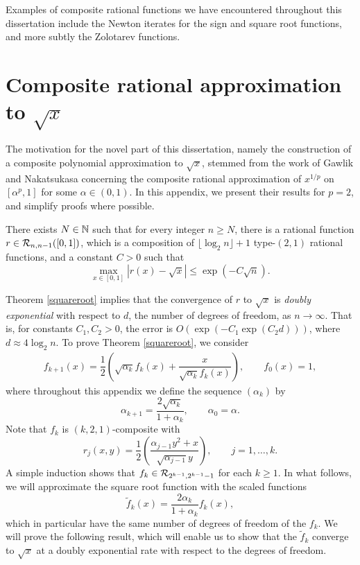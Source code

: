 \begin{appendices}
Examples of composite rational functions we have encountered throughout this dissertation include the Newton iterates for the sign and square root functions, and more subtly the Zolotarev functions.

\section{Composite rational approximation to \texorpdfstring{$\sqrt{x}$}{sqrt(x)}}

The motivation for the novel part of this dissertation, namely the construction of a composite polynomial approximation to $\sqrt{x}$, stemmed from the work of Gawlik and Nakatsukasa \cite{Yuji} concerning the composite rational approximation of $x^{1/p}$ on $[\alpha^p,1]$ for some $\alpha \in (0,1)$. In this appendix, we present their results for $p=2$, and simplify proofs where possible. 

\begin{thm}\label{squareroot}
There exists $N \in \mathbb{N}$ such that for every integer $n \geq N$, there is a rational function $r \in \mathcal{R}_{n,n-1}([0,1])$, which is a composition of $\lfloor\log_2 n\rfloor+1$ type-$(2,1)$ rational functions, and a constant $C>0$ such that
\[\max_{x\in[0,1]}|r(x)-\sqrt{x}| \leq \exp(-C\sqrt{n}).\]
\end{thm}

Theorem \ref{squareroot} implies that the convergence of $r$ to $\sqrt{x}$ is \textit{doubly exponential} with respect to $d$, the number of degrees of freedom, as $n\to\infty$. That is, for constants $C_1,C_2>0$, the error is $O(\exp(-C_1\exp(C_2 d)))$, where $d\approx 4\log_2 n$. To prove Theorem \ref{squareroot}, we consider
\begin{align}
    f_{k+1}(x)=\dfrac{1}{2}\left(\sqrt{\alpha_k}f_k(x)+\dfrac{x}{\sqrt{\alpha_k} f_k(x)}\right), \qquad f_0(x)=1, \label{theiter}
\end{align}
where throughout this appendix we define the sequence $(\alpha_k)$ by 
\[\alpha_{k+1}=\dfrac{2\sqrt{\alpha_k}}{1+\alpha_k},\qquad \alpha_0=\alpha.\]
Note that $f_k$ is $(k,2,1)$-composite with 
\[r_j(x,y)=\dfrac{1}{2}\left(\dfrac{\alpha_{j-1}y^2+x}{\sqrt{\alpha_{j-1}}y}\right), \qquad j=1,\dots,k.\]
A simple induction shows that $f_k \in \mathcal{R}_{2^{k-1},2^{k-1}-1}$ for each $k\geq 1$. In what follows, we will approximate the square root function with the scaled functions
\[\tilde{f}_k(x)=\dfrac{2\alpha_k}{1+\alpha_k}f_k(x),\]
which in particular have the same number of degrees of freedom of the $f_k$. We will prove the following result, which will enable us to show that the $\tilde{f}_k$ converge to $\sqrt{x}$ at a doubly exponential rate with respect to the degrees of freedom.


\end{appendices}
